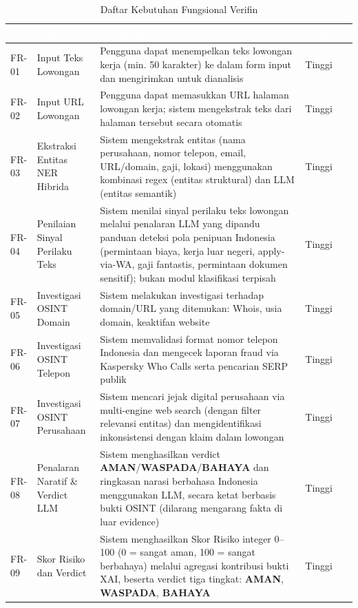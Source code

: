 \documentclass[12pt,a4paper]{article}
\newcommand{\thead}[1]{\textcolor{white}{\textbf{#1}}}
\begin{document}
\begin{adjustwidth}{0.50cm}{0pt}
\begin{table}[H]
\centering
\caption{Daftar Kebutuhan Fungsional Verifin}
\label{tab:fr-list}
\small
\begin{tabularx}{\linewidth}{@{}p{1.2cm}p{3.0cm}Yp{1.6cm}@{}}
\toprule
{}\thead{ID} & \thead{Nama} & \thead{Deskripsi} & \thead{Prioritas} \\
\midrule
{}
FR-01 & Input Teks Lowongan & Pengguna dapat menempelkan teks lowongan kerja (min. 50 karakter) ke dalam form input dan mengirimkan untuk dianalisis & Tinggi \\
FR-02 & Input URL Lowongan & Pengguna dapat memasukkan URL halaman lowongan kerja; sistem mengekstrak teks dari halaman tersebut secara otomatis & Tinggi \\
FR-03 & Ekstraksi Entitas NER Hibrida & Sistem mengekstrak entitas (nama perusahaan, nomor telepon, email, URL/domain, gaji, lokasi) menggunakan kombinasi regex (entitas struktural) dan LLM (entitas semantik) & Tinggi \\
FR-04 & Penilaian Sinyal Perilaku Teks & Sistem menilai sinyal perilaku teks lowongan melalui penalaran LLM yang dipandu panduan deteksi pola penipuan Indonesia (permintaan biaya, kerja luar negeri, apply-via-WA, gaji fantastis, permintaan dokumen sensitif); bukan modul klasifikasi terpisah & Tinggi \\
FR-05 & Investigasi OSINT Domain & Sistem melakukan investigasi terhadap domain/URL yang ditemukan: Whois, usia domain, keaktifan website & Tinggi \\
FR-06 & Investigasi OSINT Telepon & Sistem memvalidasi format nomor telepon Indonesia dan mengecek laporan fraud via Kaspersky Who Calls serta pencarian SERP publik & Tinggi \\
FR-07 & Investigasi OSINT Perusahaan & Sistem mencari jejak digital perusahaan via multi-engine web search (dengan filter relevansi entitas) dan mengidentifikasi inkonsistensi dengan klaim dalam lowongan & Tinggi \\
FR-08 & Penalaran Naratif \& Verdict LLM & Sistem menghasilkan verdict \textbf{AMAN}/\textbf{WASPADA}/\textbf{BAHAYA} dan ringkasan narasi berbahasa Indonesia menggunakan LLM, secara ketat berbasis bukti OSINT (dilarang mengarang fakta di luar evidence) & Tinggi \\
FR-09 & Skor Risiko dan Verdict & Sistem menghasilkan Skor Risiko integer 0--100 (0 = sangat aman, 100 = sangat berbahaya) melalui agregasi kontribusi bukti XAI, beserta verdict tiga tingkat: \textbf{AMAN}, \textbf{WASPADA}, \textbf{BAHAYA} & Tinggi \\

\end{tabularx}
\end{table}
\end{adjustwidth}
\end{document}
